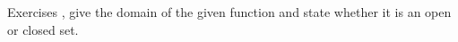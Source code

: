 {\noindent Exercises}
{, give the domain of the given function and state whether it is an open or closed set.}
